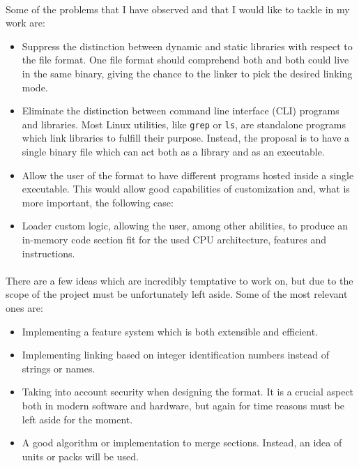 \documentclass[12pt]{article}
\begin{document}
	\paragraph{}Some of the problems that I have observed and that I would like to tackle in my work are:
	\begin{itemize}
		\item Suppress the distinction between dynamic and static libraries with respect to the file format. One file format should comprehend both and both could live in the same binary, giving the chance to the linker to pick the desired linking mode.
		\item Eliminate the distinction between command line interface (CLI) programs and libraries. Most Linux utilities, like \verb|grep| or \verb|ls|, are standalone programs which link libraries to fulfill their purpose. Instead, the proposal is to have a single binary file which can act both as a library and as an executable.
		\item Allow the user of the format to have different programs hosted inside a single executable. This would allow good capabilities of customization and, what is more important, the following case:
		\item Loader custom logic, allowing the user, among other abilities, to produce an in-memory code section fit for the used CPU architecture, features and instructions.
	\end{itemize}
	\paragraph{}There are a few ideas which are incredibly temptative to work on, but due to the scope of the project must be unfortunately left aside. Some of the most relevant ones are:
	\begin{itemize}
		\item Implementing a feature system which is both extensible and efficient.
		\item Implementing linking based on integer identification numbers instead of strings or names.
		\item Taking into account security when designing the format. It is a crucial aspect both in modern software and hardware, but again for time reasons must be left aside for the moment.
		\item A good algorithm or implementation to merge sections. Instead, an idea of units or packs will be used.
	\end{itemize}
\end{document}
